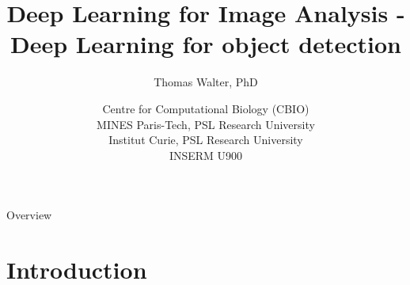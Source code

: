 \documentclass[xcolor=pdftex,dvipsnames,table]{beamer}
\title{Deep Learning for Image Analysis - \\
	   Deep Learning for object detection}
\author{Thomas Walter, PhD}
\date{Centre for Computational Biology (CBIO) \\
	  MINES Paris-Tech, PSL Research University \\
	  Institut Curie, PSL Research University \\
	  INSERM U900}
\begin{document}
\begin{frame}
\titlepage
\end{frame}

\begin{frame}{Overview}
\tableofcontents
\end{frame}

\section{Introduction}

\end{document}
